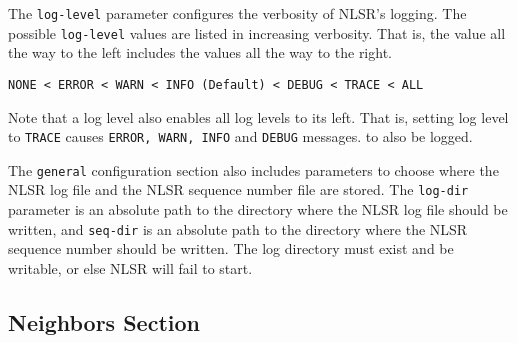 The \texttt{log-level} parameter configures the verbosity of NLSR's logging.
The possible \texttt{log-level} values are listed in increasing verbosity. That is, the value all the way to the left includes the values all the way to the right.
\begin{verbatim}
NONE < ERROR < WARN < INFO (Default) < DEBUG < TRACE < ALL
\end{verbatim}

Note that a log level also enables all log levels to its left. That is, setting log level to \texttt{TRACE} causes \texttt{ERROR, WARN, INFO} and \texttt{DEBUG} messages. to also be logged.

The \texttt{general} configuration section also includes parameters to choose where the NLSR log file and the NLSR sequence number file are stored.
The \texttt{log-dir} parameter is an absolute path to the directory where the NLSR log file should be written, and \texttt{seq-dir} is an absolute path to the directory where the NLSR sequence number should be written. The log directory must exist and be writable, or else NLSR will fail to start.

\subsection{Neighbors Section}

